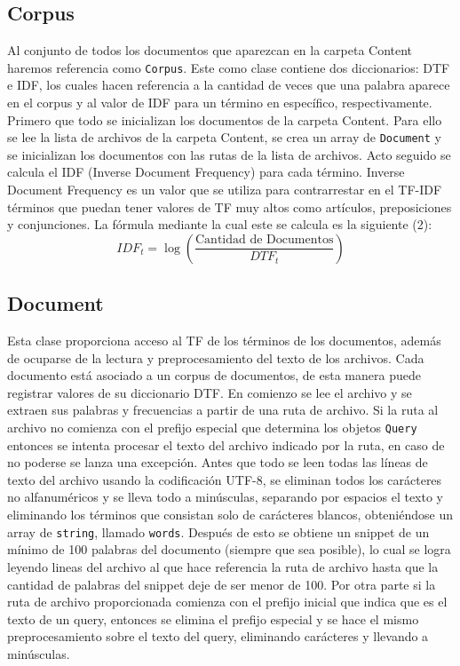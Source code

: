 \documentclass[a4paper,12pt]{article}
\begin{document}
\subsection{Corpus}
    Al conjunto de todos los documentos que aparezcan en la carpeta Content haremos referencia como \texttt{Corpus}.
Este como clase contiene dos diccionarios: DTF e IDF, los cuales hacen referencia a la cantidad de veces que una palabra
aparece en el corpus y al valor de IDF para un término en específico, respectivamente. Primero que todo se inicializan
los documentos de la carpeta Content. Para ello se lee la lista de archivos de la carpeta Content, se crea un array de
\texttt{Document} y se inicializan los documentos con las rutas de la lista de archivos.
    Acto seguido se calcula el IDF (Inverse Document Frequency) para cada término. Inverse Document Frequency es un valor
que se utiliza para contrarrestar en el TF-IDF términos que puedan tener valores de TF muy altos como artículos, preposiciones
y conjunciones. La fórmula mediante la cual este se calcula es la siguiente (2):
\begin{equation}
    IDF_t = \log\left(\frac{\text{Cantidad de Documentos}}{DTF_t}\right)
\end{equation}

\subsection{Document}
    Esta clase proporciona acceso al TF de los términos de los documentos, además de ocuparse de la lectura y
preprocesamiento del texto de los archivos. Cada documento está asociado a un corpus de documentos, de esta manera puede
registrar valores de su diccionario DTF. En comienzo se lee el archivo y se extraen sus palabras y frecuencias a partir
de una ruta de archivo. Si la ruta al archivo no comienza con el prefijo especial que determina los objetos \texttt{Query} entonces
se intenta procesar el texto del archivo indicado por la ruta, en caso de no poderse se lanza una excepción. Antes que todo se leen todas
las líneas de texto del archivo usando la codificación UTF-8, se eliminan todos los carácteres no alfanuméricos y se lleva todo a minúsculas,
separando por espacios el texto y eliminando los términos que consistan solo de carácteres blancos, obteniéndose un array de \texttt{string},
llamado \texttt{words}. Después de esto se obtiene un snippet de un mínimo de 100 palabras del documento (siempre que sea posible), lo cual se
logra leyendo lineas del archivo al que hace referencia la ruta de archivo hasta que la cantidad de palabras del snippet deje de ser menor de 100.
    Por otra parte si la ruta de archivo proporcionada comienza con el prefijo inicial que indica que es el texto de un query, entonces
se elimina el prefijo especial y se hace el mismo preprocesamiento sobre el texto del query, eliminando carácteres y llevando a minúsculas.
\end{document}
